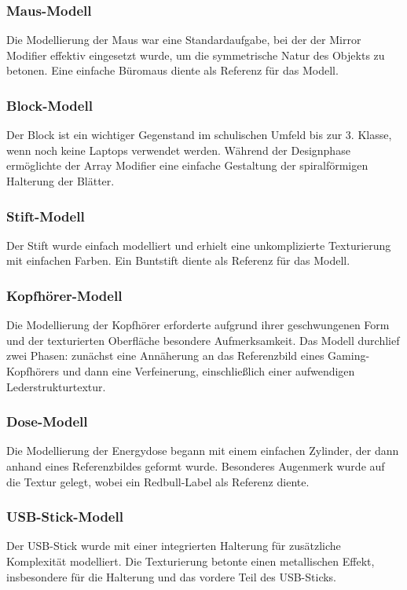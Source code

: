 \subsubsection*{Maus-Modell}
Die Modellierung der Maus war eine Standardaufgabe, bei der der Mirror Modifier effektiv eingesetzt wurde, um die
symmetrische Natur des Objekts zu betonen. Eine einfache Büromaus diente als Referenz für das Modell.

\subsubsection*{Block-Modell}
Der Block ist ein wichtiger Gegenstand im schulischen Umfeld bis zur 3. Klasse, wenn noch keine Laptops verwendet werden.
Während der Designphase ermöglichte der Array Modifier eine einfache Gestaltung der spiralförmigen Halterung der Blätter.

\subsubsection*{Stift-Modell}
Der Stift wurde einfach modelliert und erhielt eine unkomplizierte Texturierung mit einfachen Farben. Ein Buntstift
diente als Referenz für das Modell.

\subsubsection*{Kopfhörer-Modell}
Die Modellierung der Kopfhörer erforderte aufgrund ihrer geschwungenen Form und der texturierten Oberfläche besondere
Aufmerksamkeit. Das Modell durchlief zwei Phasen: zunächst eine Annäherung an das Referenzbild eines Gaming-Kopfhörers
und dann eine Verfeinerung, einschließlich einer aufwendigen Lederstrukturtextur.

\subsubsection*{Dose-Modell}
Die Modellierung der Energydose begann mit einem einfachen Zylinder, der dann anhand eines Referenzbildes geformt wurde.
Besonderes Augenmerk wurde auf die Textur gelegt, wobei ein Redbull-Label als Referenz diente.

\subsubsection*{USB-Stick-Modell}
Der USB-Stick wurde mit einer integrierten Halterung für zusätzliche Komplexität modelliert. Die Texturierung betonte
einen metallischen Effekt, insbesondere für die Halterung und das vordere Teil des USB-Sticks.

